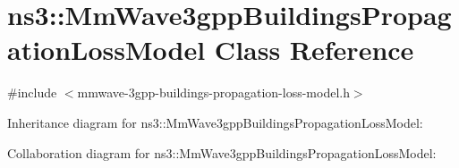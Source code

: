 \hypertarget{classns3_1_1MmWave3gppBuildingsPropagationLossModel}{}\section{ns3\+:\+:Mm\+Wave3gpp\+Buildings\+Propagation\+Loss\+Model Class Reference}
\label{classns3_1_1MmWave3gppBuildingsPropagationLossModel}


{\ttfamily \#include $<$mmwave-\/3gpp-\/buildings-\/propagation-\/loss-\/model.\+h$>$}



Inheritance diagram for ns3\+:\+:Mm\+Wave3gpp\+Buildings\+Propagation\+Loss\+Model\+:


Collaboration diagram for ns3\+:\+:Mm\+Wave3gpp\+Buildings\+Propagation\+Loss\+Model\+:
